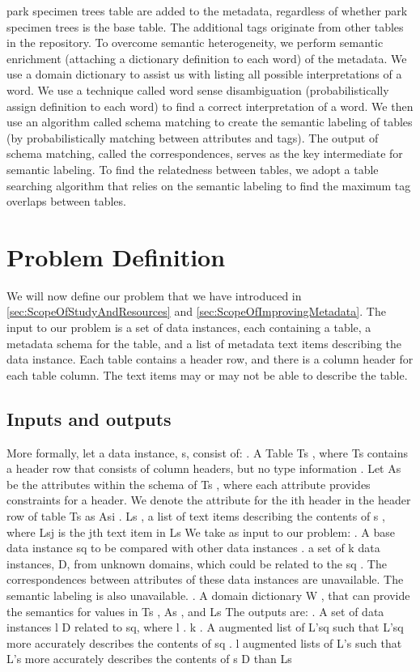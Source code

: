 park specimen trees table are added to the metadata, regardless of whether park specimen trees is the base table. The additional tags originate from other tables in the repository.
To overcome semantic heterogeneity, we perform semantic enrichment (attaching a dictionary definition to each word) of the metadata. We use a domain dictionary to assist us with listing all possible interpretations of a word. We use a technique called word sense disambiguation (probabilistically assign definition to each word) to find a correct interpretation of a word. We then use an algorithm called schema matching to create the semantic labeling of tables (by probabilistically matching between attributes and tags). The output of schema matching, called the correspondences, serves as the key intermediate for semantic labeling. To find the relatedness between tables, we adopt a table searching algorithm that relies on the semantic labeling to find the maximum tag overlaps between tables.

\section{Problem Definition}
\label{sec:ProblemDefinition}

We will now define our problem that we have introduced in \autoref{sec:ScopeOfStudyAndResources} and \autoref{sec:ScopeOfImprovingMetadata}. The input to our problem is a set of data instances, each containing a table, a metadata schema for the table, and a list of metadata text items describing the data instance. Each table contains a header row, and there is a column header for each table column. The text items may or may not be able to describe the table.

\subsection{Inputs and outputs}
More formally, let a data instance, s, consist of:
. A Table Ts , where Ts contains a header row that consists of column headers, but no type information
. Let As be the attributes within the schema of Ts , where each attribute provides constraints for a header. We denote the attribute for the ith header in the header row of table Ts as Asi
. Ls , a list of text items describing the contents of s , where Lsj is the jth text item in Ls
We take as input to our problem:
. A base data instance sq to be compared with other data instances
. a set of k data instances, D, from unknown domains, which could be related to the sq . The correspondences between attributes of these data instances are unavailable. The semantic labeling is also unavailable.
. A domain dictionary W , that can provide the semantics for values in Ts , As , and Ls
The outputs are:
. A set of data instances l  D related to sq, where l . k
. A augmented list of L'sq such that L'sq more accurately describes the contents of sq
. l augmented lists of L's such that L's more accurately describes the contents of s  D than Ls

